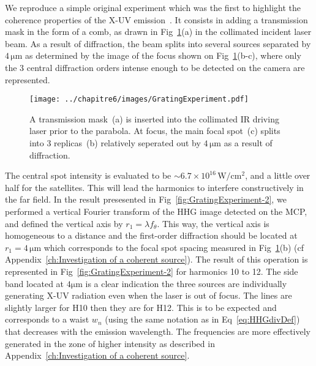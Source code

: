 
\noindent We reproduce a simple original experiment which was the first to highlight the coherence properties of the X-UV emission~\cite{thaury2008coherent}. It consists in adding a transmission mask in the form of a comb, as drawn in Fig~\ref{fig:GratingExperiment}(a) in the collimated incident laser beam. As a result of diffraction, the beam splits into several sources separated by $4\,\mathrm{\mu m}$ as determined by the image of the focus shown on Fig~\ref{fig:GratingExperiment}(b-c), where only the 3 central diffraction orders intense enough to be detected on the camera are represented.
\begin{figure}[H]
\centering
\texttt{[image: ../chapitre6/images/GratingExperiment.pdf]}\\
\caption{\label{fig:GratingExperiment} A transmission mask~(a) is inserted into the collimated IR driving laser prior to the parabola. At focus, the main focal spot~(c) splits into 3 replicas~(b) relatively seperated out by $4\,\mathrm{\mu m}$ as a result of diffraction.}
\end{figure}

\noindent The central spot intensity is evaluated to be $\sim 6.7\times 10^{16}\,\mathrm{W/cm^2}$, and a little over half for the satellites. This will lead the harmonics to interfere constructively in the far field. In the result presesented in Fig~\ref{fig:GratingExperiment-2}, we performed a vertical Fourier transform of the HHG image detected on the MCP, and defined the vertical axis by $r_1= \lambda f_{\theta}$. This way, the vertical axis is homogeneous to a distance and the first-order diffraction should be located at $r_1 =4\,\mathrm{\mu m}$ which corresponds to the focal spot spacing measured in Fig~\ref{fig:GratingExperiment}(b) (cf Appendix~\ref{ch:Investigation of a coherent source}).
The result of this operation is represented in Fig~\ref{fig:GratingExperiment-2} for harmonics 10 to 12. The side band located at $4\mathrm{\mu m}$ is a clear indication the three sources are individually generating X-UV radiation even when the laser is out of focus.
\noindent The lines are slightly larger for H10 then they are for H12. This is to be expected and corresponds to a waist $w_n$ (using the same notation as in Eq~\ref{eq:HHGdivDef}) that decreases with the emission wavelength. The frequencies are more effectively generated in the zone of higher intensity as described in Appendix~\ref{ch:Investigation of a coherent source}.


